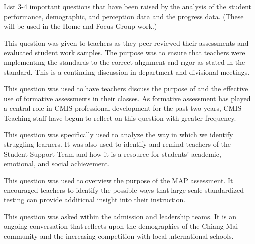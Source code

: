 
List 3-4 important questions that have been raised by the analysis of the student performance, demographic, and perception data and the progress data.  (These will be used in the Home and Focus Group work.)


This question was given to teachers as they peer reviewed their assessments and evaluated student work samples. The purpose was to ensure that teachers were implementing the standards to the correct alignment and rigor as stated in the standard. This is a continuing discussion in department and divisional meetings.


This question was used to have teachers discuss the purpose of and the effective use of formative assessments in their classes. As formative assessment has played a central role in CMIS professional development for the past two years, CMIS Teaching staff have begun to reflect on this question with greater frequency. 


This question was specifically used to analyze the way in which we identify struggling learners. It was also used to identify and remind teachers of the Student Support Team and how it is a resource for students’ academic, emotional, and social achievement.


This question was used to overview the purpose of the MAP assessment. It encouraged teachers to identify the possible ways that large scale standardized testing can provide additional insight into their instruction. 


This question was asked within the admission and leadership teams. It is an ongoing conversation that reflects upon the demographics of the Chiang Mai community and the increasing competition with local international schools. 
